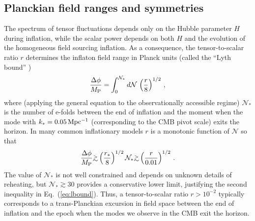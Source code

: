 \subsection{Planckian field ranges and symmetries}
The spectrum of tensor fluctuations depends only on the Hubble parameter $H$ during inflation, while the scalar power depends on both $H$ and the evolution of the homogeneous field sourcing inflation. As a consequence, the tensor-to-scalar ratio $r$ determines the inflaton field range in Planck units (called the ``Lyth bound'' \cite{Lyth:1996im})
\begin{equation}
\label{eq:Lyth}
\frac{\Delta\phi}{M_{\rm P}}=\int_0^{\mathcal{N}_\ast}d\mathcal{N}\,\left(\frac{r}{8}\right)^{1/2}\,,
\end{equation}
where (applying the general equation to the observationally accessible regime) $\mathcal{N}_\ast$ is the number of e-folds between the end of inflation and the moment when the mode with $k_\ast=0.05\,{\rm Mpc^{-1}}$ (corresponding to the CMB pivot scale) exits the horizon. In many common inflationary models $r$ is a monotonic function of $\mathcal{N}$ so that
\begin{equation}
\label{eq:lbound}
\frac{\Delta\phi}{M_{\rm P}}\gtrsim \left(\frac{r_\ast}{8}\right)^{1/2}\mathcal{N}_\ast\gtrsim \left(\frac{r}{0.01}\right)^{1/2}\,.
\end{equation}  
The value of $\mathcal{N}_\ast$ is not well constrained and depends on unknown details of reheating, but $\mathcal{N}_\ast\gtrsim 30$ provides a conservative lower limit, justifying the second inequality in Eq.~(\ref{eq:lbound}). Thus, a tensor-to-scalar ratio $r>10^{-2}$ typically corresponds to a trans-Planckian excursion in field space between the end of inflation and the epoch when the modes we observe in the CMB exit the horizon.

